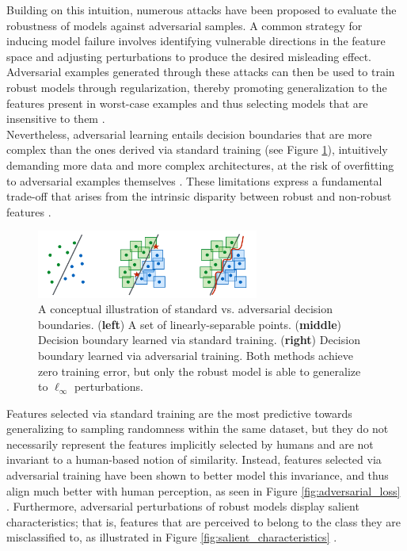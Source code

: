 Building on this intuition, numerous attacks have been proposed to evaluate the 
robustness of models against adversarial samples. A common strategy for inducing model 
failure involves identifying vulnerable directions in the feature space and adjusting 
perturbations to produce the desired misleading effect. Adversarial examples 
generated through these attacks can then be used to train robust models through 
regularization, thereby promoting generalization to the features present in 
worst-case examples and thus selecting models that are insensitive
to them
\cite{baiRecentAdvancesAdversarial2021}.\\

Nevertheless, adversarial learning entails decision boundaries 
that are more complex than the ones derived via standard training
(see Figure \ref{fig:adversarial_complexity}), 
intuitively demanding more data and more complex 
architectures, at the risk of
overfitting to adversarial examples themselves
\cite{schmidtAdversariallyRobustGeneralization2018}. 
These limitations express a fundamental trade-off 
that arises from the intrinsic 
disparity between robust and non-robust features
\cite{tsiprasRobustnessMayBe2019, zhangTheoreticallyPrincipledTradeoff2019}. \\

\begin{figure}
    \centering
    \includegraphics[width=0.65\textwidth]{img/introduction/adversarial_complexity.png}
    \caption{
    A conceptual illustration of standard vs. adversarial 
    decision boundaries. (\textbf{left}) A set of linearly-separable points. 
    (\textbf{middle}) Decision boundary learned via standard training.
    (\textbf{right}) Decision boundary learned via adversarial training.
    Both methods achieve zero training error, but only the robust model
    is able to generalize to $\ell_\infty$ perturbations.
    \cite{madryDeepLearningModels2019}
    }
    \label{fig:adversarial_complexity}
\end{figure}

Features selected via standard training
are the most predictive towards generalizing
to sampling randomness within the same dataset, but they do
not necessarily represent the features implicitly selected 
by humans and are not invariant to a human-based notion 
of similarity. Instead, features selected via adversarial training 
have been shown to better model this
invariance, and thus align much better with 
human perception, as seen in Figure \ref{fig:adversarial_loss}
\cite{ilyasAdversarialExamplesAre2019}. Furthermore, adversarial perturbations of robust 
models display salient characteristics;
that is, features that are perceived to belong to the
class they are misclassified to, as illustrated in Figure \ref{fig:salient_characteristics}
\cite{tsiprasRobustnessMayBe2019}. \\

